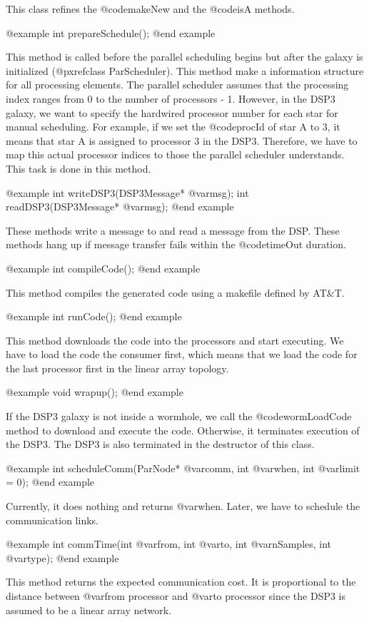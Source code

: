 {This class refines the @code{makeNew} and the @code{isA} methods.

@example
int prepareSchedule();
@end example

This method is called before the parallel scheduling begins but after
the galaxy is initialized (@pxref{class ParScheduler}). This method
make a information structure for all processing elements. The parallel
scheduler assumes that the processing index ranges from 0 to the number
of processors - 1. However, in the DSP3 galaxy, we want to specify the
hardwired processor number for each star for manual scheduling. For example,
if we set the @code{procId} of star A to 3, it means that star A is
assigned to processor 3 in the DSP3. Therefore, we have to map this
actual processor indices to those the parallel scheduler understands.
This task is done in this method.

@example
int writeDSP3(DSP3Message* @var{msg});
int readDSP3(DSP3Message* @var{msg});
@end example

These methods write a message to and read a message from the DSP.
These methods hang up if message transfer fails within the @code{timeOut}
duration.

@example
int compileCode();
@end example

This method compiles the generated code using a makefile defined by AT&T.

@example
int runCode();
@end example

This method downloads the code into the processors and start executing.
We have to load the code the consumer first, which means that we load the
code for the last processor first in the linear array topology.

@example
void wrapup();
@end example

If the DSP3 galaxy is not inside a wormhole, we call the @code{wormLoadCode}
method to download and execute the code. Otherwise, it terminates execution
of the DSP3. The DSP3 is also terminated in the destructor of this class.

@example
int scheduleComm(ParNode* @var{comm}, int @var{when}, int @var{limit} = 0);
@end example

Currently, it does nothing and returns @var{when}. Later, we have to schedule
the communication links.

@example
int commTime(int @var{from}, int @var{to}, int @var{nSamples}, int @var{type});
@end example

This method returns the expected communication cost. It is proportional to
the distance between @var{from} processor and @var{to} processor since the
DSP3 is assumed to be a linear array network.

}
